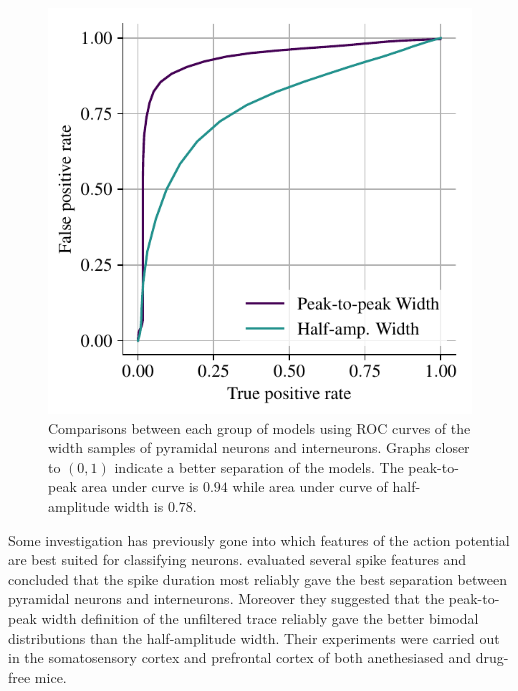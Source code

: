 \documentclass[altfont, fleqn]{uiophd}
\begin{document}
\begin{figure}
    \vspace{-20pt}
    \begin{center}
        \includegraphics[width=\linewidth]{images/sec_4/roc_curves.pdf}
        \vspace{-20pt}
        \caption{%
            Comparisons between each group of models using ROC curves
            of the width samples of pyramidal neurons and interneurons. 
            Graphs closer to $(0,1)$ indicate a better separation
            of the models. 
            The peak-to-peak area under curve is $0.94$ while
            area under curve of half-amplitude width is $0.78$.
            }
        \label{fig:4_roc_curves}
        \vspace{-10pt}
    \end{center}
\end{figure}

Some investigation has previously gone into which features of 
the action potential 
are best suited
for classifying neurons. 
\Textcite{bartho_characterization_2004}
evaluated several spike features and 
concluded that
the spike duration most reliably gave the best separation between pyramidal neurons and
interneurons. 
Moreover they suggested that the peak-to-peak width definition
of the unfiltered trace reliably gave the better bimodal distributions
than the half-amplitude width. 
Their experiments were carried out in
the somatosensory cortex and prefrontal cortex of both anethesiased
and drug-free mice.
\newline
\end{document}
